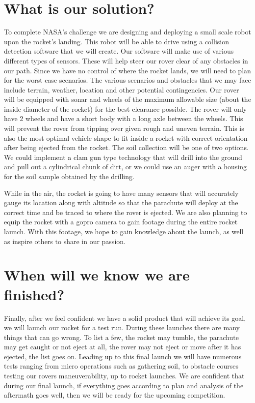 \documentclass[10pt]{article}
\begin{document}
\section{What is our solution?}
To complete NASA’s challenge we are designing and deploying a small scale robot upon the rocket’s landing. This robot will be able to drive using a collision detection software that we will create. Our software will make use of various different types of sensors. These will help steer our rover clear of any obstacles in our path. Since we have no control of where the rocket lands, we will need to plan for the worst case scenarios. The various scenarios and obstacles that we may face include terrain, weather, location and other potential contingencies. Our rover will be equipped with sonar and wheels of the maximum allowable size (about the inside diameter of the rocket) for the best clearance possible. The rover will only have 2 wheels and have a short body with a long axle between the wheels. This will prevent the rover from tipping over given rough and uneven terrain. This is also the most optimal vehicle shape to fit inside a rocket with correct orientation after being ejected from the rocket. The soil collection will be one of two options. We could implement a clam gun type technology that will drill into the ground and pull out a cylindrical chunk of dirt, or we could use an auger with a housing for the soil sample obtained by the drilling.

While in the air, the rocket is going to have many sensors that will accurately gauge its location along with altitude so that the parachute will deploy at the correct time and be traced to where the rover is ejected. We are also planning to equip the rocket with a gopro camera to gain footage during the entire rocket launch. With this footage, we hope to gain knowledge about the launch, as well as inspire others to share in our passion. 

\section{When will we know we are finished?}
Finally, after we feel confident we have a solid product that will achieve its goal, we will launch our rocket for a test run. During these launches there are many things that can go wrong. To list a few, the rocket may tumble, the parachute may get caught or not eject at all, the rover may not eject or move after it has ejected, the list goes on. Leading up to this final launch we will have numerous tests ranging from micro operations such as gathering soil, to obstacle courses testing our rovers maneuverability, up to rocket launches. We are confident that during our final launch, if everything goes according to plan and analysis of the aftermath goes well, then we will be ready for the upcoming competition.
\end{document}
